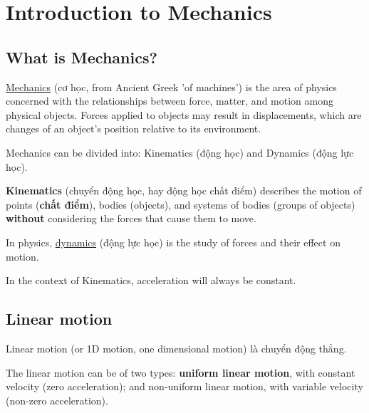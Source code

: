 \chapter{Introduction to Mechanics}

\section{What is Mechanics?}

\href{https://en.wikipedia.org/wiki/Mechanics}{Mechanics} (cơ học, from Ancient Greek 'of machines') is the area of physics concerned with the relationships between force, matter, and motion among physical objects. Forces applied to objects may result in displacements, which are changes of an object's position relative to its environment.

Mechanics can be divided into: Kinematics (động học) and Dynamics (động lực học).

\textbf{Kinematics} (chuyển động học, hay động học chất điểm) describes the motion of points (\textbf{chất điểm}), bodies (objects), and systems of bodies (groups of objects) \textbf{without} considering the forces that cause them to move.

In physics, \href{https://en.wikipedia.org/wiki/Dynamics_(mechanics)}{dynamics} (động lực học) is the study of forces and their effect on motion.

In the context of Kinematics, acceleration will always be constant.

\section{Linear motion}

Linear motion (or 1D motion, one dimensional motion) là chuyển động thẳng.

The linear motion can be of two types: \textbf{uniform linear motion}, with constant velocity (zero acceleration); and non-uniform linear motion, with variable velocity (non-zero acceleration).
